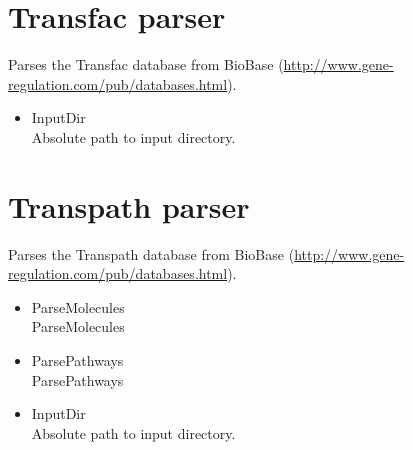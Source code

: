     
    
\section{Transfac parser}
Parses the Transfac database from BioBase (\url{http://www.gene-regulation.com/pub/databases.html}).
\begin{itemize}
  \item{InputDir}\\
  Absolute path to input directory.
\end{itemize}
    
\section{Transpath parser}
Parses the Transpath database from BioBase (\url{http://www.gene-regulation.com/pub/databases.html}).
\begin{itemize}
  \item{ParseMolecules}\\
  ParseMolecules
  \item{ParsePathways}\\
  ParsePathways
  \item{InputDir}\\
  Absolute path to input directory. 
\end{itemize}
    
